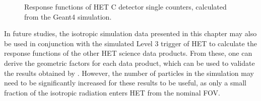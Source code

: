 \begin{figure}
	\centering
	
	\caption[Response functions of \acs{HET} C detector single counters]{Response functions of \ac{HET} C detector single counters, calculated from the \ac{Geant4} simulation.}
	\label{fig:het_c_responsefunction}
\end{figure}

In future studies, the isotropic simulation data presented in this chapter may also be used in conjunction with the simulated Level 3 trigger of HET to calculate the response functions of the other \ac{HET} science data products. From these, one can derive the geometric factors for each data product, which can be used to validate the results obtained by \citet{Elftmann-2020-PhD}. However, the number of particles in the simulation may need to be significantly increased for these results to be useful, as only a small fraction of the isotropic radiation enters HET from the nominal \ac{FOV}.